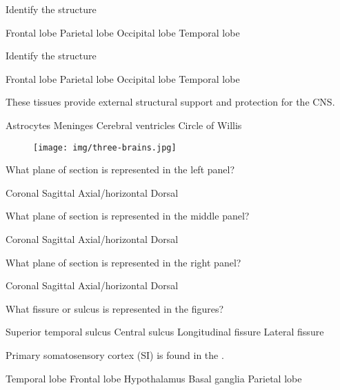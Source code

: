 \documentclass[answers]{exam}
\begin{document}
\begin{questions}
\question Identify the structure
\begin{choices}
\choice Frontal lobe
\choice Parietal lobe
\correctchoice Occipital lobe
\choice Temporal lobe
\end{choices}

\question Identify the structure
\begin{choices}
\choice Frontal lobe
\correctchoice Parietal lobe
\choice Occipital lobe
\choice Temporal lobe
\end{choices}

\question These tissues provide external structural support and protection for the CNS.
\begin{choices}
\choice Astrocytes
\correctchoice Meninges
\choice Cerebral ventricles
\choice Circle of Willis
\end{choices}

\newpage

\begin{figure}[h]
\texttt{[image: img/three-brains.jpg]}
\centering
\end{figure}

\question What plane of section is represented in the left panel?
\begin{choices}
\choice Coronal
\choice Sagittal
\correctchoice Axial/horizontal
\choice Dorsal
\end{choices}

\question What plane of section is represented in the middle panel?
\begin{choices}
\choice Coronal
\correctchoice Sagittal
\choice Axial/horizontal
\choice Dorsal
\end{choices}

\question What plane of section is represented in the right panel?
\begin{choices}
\correctchoice Coronal
\choice Sagittal
\choice Axial/horizontal
\choice Dorsal
\end{choices}

\question What fissure or sulcus is represented in the figures?
\begin{choices}
\choice Superior temporal sulcus
\choice Central sulcus
\choice Longitudinal fissure
\correctchoice Lateral fissure
\end{choices}

\question Primary somatosensory cortex (SI) is found in the \fillin.
\begin{choices}
\choice Temporal lobe
\choice Frontal lobe
\choice Hypothalamus
\choice Basal ganglia
\correctchoice Parietal lobe
\end{choices}


\end{questions}
\end{document}
